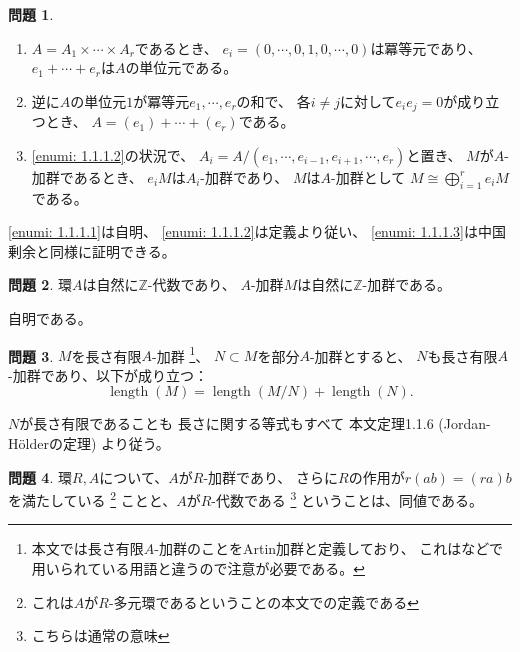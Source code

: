 \documentclass[uplatex]{jsarticle}
\makeatletter
\theoremstyle{definition}
\newtheorem{prob}[prob]{問題}
\renewenvironment{proof}[1][\proofname]{
  \pushQED{\qed}%
  \normalfont \topsep6\p@\@plus6\p@\relax
  \trivlist
  \item[\hskip\labelsep
    #1\@addpunct{\textbf{.}}]\ignorespaces
}{%
  \popQED\endtrivlist\@endpefalse
}
\providecommand{\proofname}{証明}
\DeclareMathOperator{\length}{\mathrm{length}}
\newcommand\Z{\mathbb{Z}}
\makeatother
\begin{document}
\begin{prob}\label{prob: 1.1.1}
  \begin{enumerate}
    \item \label{enumi: 1.1.1.1}
    \(A = A_1\times \cdots \times A_r\)であるとき、
    \(e_i = (0,\cdots, 0, 1, 0 ,\cdots, 0)\)は冪等元であり、
    \(e_1+\cdots +e_r\)は\(A\)の単位元である。
    \item \label{enumi: 1.1.1.2}
    逆に\(A\)の単位元\(1\)が冪等元\(e_1,\cdots,e_r\)の和で、
    各\(i\neq j\)に対して\(e_ie_j = 0\)が成り立つとき、
    \(A = (e_1) + \cdots + (e_r)\)である。
    \item \label{enumi: 1.1.1.3}
    \ref{enumi: 1.1.1.2}の状況で、
    \(A_i = A/(e_1,\cdots, e_{i-1},e_{i+1},\cdots ,e_r)\)と置き、
    \(M\)が\(A\)-加群であるとき、
    \(e_iM\)は\(A_i\)-加群であり、
    \(M\)は\(A\)-加群として
    \(M\cong \bigoplus_{i=1}^r e_iM\)である。
  \end{enumerate}
\end{prob}

\begin{proof}
  \ref{enumi: 1.1.1.1}は自明、
  \ref{enumi: 1.1.1.2}は定義より従い、
  \ref{enumi: 1.1.1.3}は中国剰余と同様に証明できる。
\end{proof}



\begin{prob}\label{prob: 1.1.2}
  環\(A\)は自然に\(\Z\)-代数であり、
  \(A\)-加群\(M\)は自然に\(\Z\)-加群である。
\end{prob}

\begin{proof}
  自明である。
\end{proof}



\begin{prob}\label{prob: 1.1.3}
  \(M\)を長さ有限\(A\)-加群
  \footnote{本文では長さ有限\(A\)-加群のことをArtin加群と定義しており、
  これは\cite{stacks-project}などで用いられている用語と違うので注意が必要である。}、
  \(N\subset M\)を部分\(A\)-加群とすると、
  \(N\)も長さ有限\(A\)-加群であり、以下が成り立つ：
  \[\length(M) = \length(M/N) + \length(N).\]
\end{prob}

\begin{proof}
  \(N\)が長さ有限であることも
  長さに関する等式もすべて
  本文定理1.1.6 (Jordan-H\"{o}lderの定理) より従う。
\end{proof}


\begin{prob}\label{prob: 1.1.4}
  環\(R,A\)について、\(A\)が\(R\)-加群であり、
  さらに\(R\)の作用が\(r(ab) =(ra)b\)を満たしている
  \footnote{これは\(A\)が\(R\)-多元環であるということの本文での定義である}
  ことと、\(A\)が\(R\)-代数である
  \footnote{こちらは通常の意味}
  ということは、同値である。
\end{prob}
\end{document}
